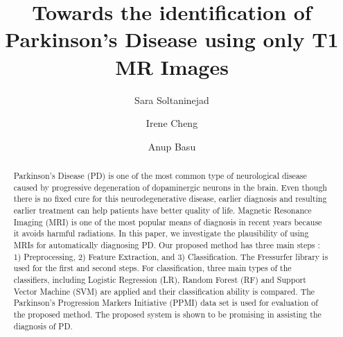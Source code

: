\documentclass[runningheads,a4paper]{llncs}
\begin{document}

\title{Towards the identification of Parkinson’s Disease using only T1 MR Images}


%
%
\author{Sara Soltaninejad\and Irene Cheng\and Anup Basu}



%
%

\maketitle


\begin{abstract}
Parkinson’s Disease (PD) is one of the most common type of neurological disease caused by progressive degeneration of dopaminergic neurons in the brain. Even though there is no fixed cure for this neurodegenerative disease, earlier diagnosis and resulting earlier treatment can help patients have better quality of life. Magnetic Resonance Imaging (MRI) is one of the most popular means of diagnosis in recent years because it avoids harmful radiations. In this paper, we investigate the plausibility of using MRIs for automatically diagnosing PD. Our proposed method has three main steps : 1) Preprocessing, 2) Feature Extraction, and 3) Classification. The Fressurfer library is used for the first and second steps. For classification, three main types of the classifiers, including Logistic Regression (LR), Random Forest (RF) and Support Vector Machine (SVM) are applied and their classification ability is compared. The Parkinson’s
Progression Markers Initiative (PPMI) data set is used for evaluation of the proposed method. The proposed system is shown to be promising in assisting the diagnosis of PD.
\end{abstract}
\end{document}
